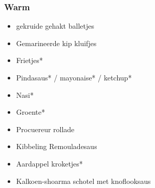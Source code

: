 \subsubsection*{Warm}
\begin{itemize}
	\item	gekruide gehakt balletjes
	\item	Gemarineerde kip kluifjes
	\item	Frietjes*
	\item	Pindasaus* / mayonaise* / ketchup*
	\item	Nasi*
	\item	Groente*
	\item	Procuereur rollade
	\item	Kibbeling Remouladesaus
	\item	Aardappel kroketjes*
	\item	Kalkoen-shoarma schotel met knoflooksaus
	
\end{itemize}
